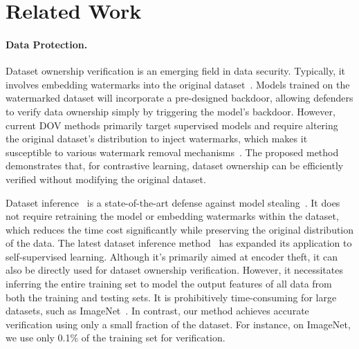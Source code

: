 \section{Related Work}
\label{gen_inst}


\paragraph{Data Protection.}
Dataset ownership verification is an emerging field in data security. Typically, it involves embedding watermarks into the original dataset~\citep{guo2023domain,li2022untargeted,li2023black,tang2023did}. Models trained on the watermarked dataset will incorporate a pre-designed backdoor, allowing defenders to verify data ownership simply by triggering the model’s backdoor. However, current DOV methods primarily target supervised models and require altering the original dataset's distribution to inject watermarks, which makes it susceptible to various watermark removal mechanisms~\citep{chen2021refit,liu2021wdnet,sun2023defending,kwon2021defending,hayase2021spectre}. 
The proposed method demonstrates that, for contrastive learning, dataset ownership can be efficiently verified without modifying the original dataset. 

Dataset inference~\cite{maini2021dataset} is a state-of-the-art defense against model stealing~\citep{sha2023can,sanyal2022towards,shen2022model}. It does not require retraining the model or embedding watermarks within the dataset, which reduces the time cost significantly while preserving the original distribution of the data. The latest dataset inference method~\cite{dziedzic2022dataset} has expanded its application to self-supervised learning. Although it's primarily aimed at encoder theft, it can also be directly used for dataset ownership verification. However, it necessitates inferring the entire training set to model the output features of all data from both the training and testing sets. It is prohibitively time-consuming for large datasets, such as ImageNet~\citep{deng2009imagenet}. In contrast, our method achieves accurate verification using only a small fraction of the dataset. For instance, on ImageNet, we use only 0.1\% of the training set for verification.

